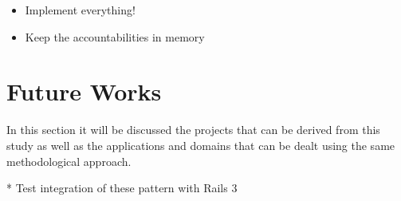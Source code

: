 \begin{itemize}
 \item Implement everything!
 \item Keep the accountabilities in memory
\end{itemize}

\section{Future Works}\label{sec:future_works}

In this section it will be discussed the projects that can be derived from this study as well as the applications and domains that can be dealt using the same methodological approach.

 * Test integration of these pattern with Rails 3


